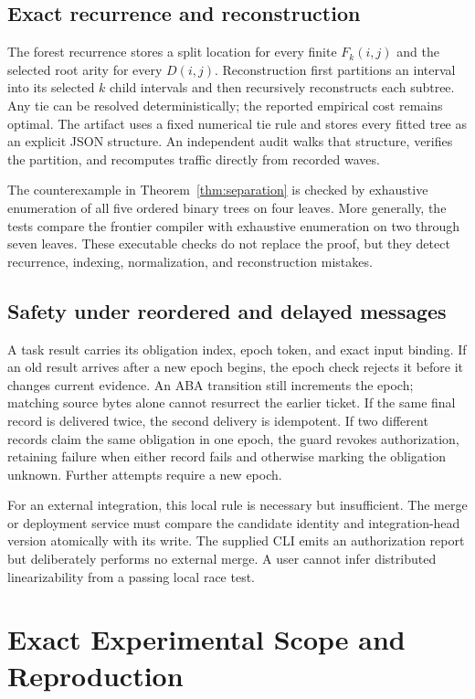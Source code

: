 \subsection{Exact recurrence and reconstruction}
The forest recurrence stores a split location for every finite $F_k(i,j)$ and the selected root arity for every $D(i,j)$. Reconstruction first partitions an interval into its selected $k$ child intervals and then recursively reconstructs each subtree. Any tie can be resolved deterministically; the reported empirical cost remains optimal. The artifact uses a fixed numerical tie rule and stores every fitted tree as an explicit JSON structure. An independent audit walks that structure, verifies the partition, and recomputes traffic directly from recorded waves.

The counterexample in Theorem~\ref{thm:separation} is checked by exhaustive enumeration of all five ordered binary trees on four leaves. More generally, the tests compare the frontier compiler with exhaustive enumeration on two through seven leaves. These executable checks do not replace the proof, but they detect recurrence, indexing, normalization, and reconstruction mistakes.

\subsection{Safety under reordered and delayed messages}
A task result carries its obligation index, epoch token, and exact input binding. If an old result arrives after a new epoch begins, the epoch check rejects it before it changes current evidence. An ABA transition still increments the epoch; matching source bytes alone cannot resurrect the earlier ticket. If the same final record is delivered twice, the second delivery is idempotent. If two different records claim the same obligation in one epoch, the guard revokes authorization, retaining failure when either record fails and otherwise marking the obligation unknown. Further attempts require a new epoch.

For an external integration, this local rule is necessary but insufficient. The merge or deployment service must compare the candidate identity and integration-head version atomically with its write. The supplied CLI emits an authorization report but deliberately performs no external merge. A user cannot infer distributed linearizability from a passing local race test.

\section{Exact Experimental Scope and Reproduction}
